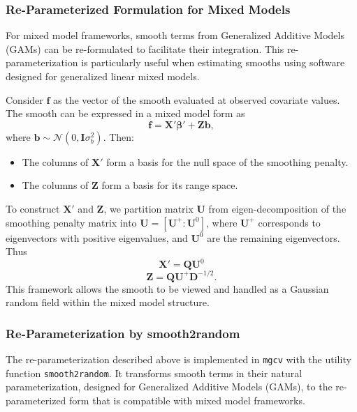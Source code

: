 \documentclass[12pt, twoside,hidelinks]{article}
\theoremstyle{definition}
\numberwithin{equation}{section}
\begin{document}
\subsubsection{Re-Parameterized Formulation for Mixed Models}\label{sec:makingsmooth:smooth2random:reparams}

For mixed model frameworks, smooth terms from Generalized Additive Models (GAMs) can be re-formulated to facilitate their integration. This re-parameterization is particularly useful when estimating smooths using software designed for generalized linear mixed models.
\newline

Consider \(\boldsymbol{f}\) as the vector of the smooth evaluated at observed covariate values. The smooth can be expressed in a mixed model form as
\[ \boldsymbol{f} = \mathbf{X}' \boldsymbol{\beta}' + \mathbf{Z}\boldsymbol{b}, \]
where \(\boldsymbol{b} \sim \mathcal{N}(0, \mathbf{I}\sigma^2_b)\). Then:
\begin{itemize}
  \item The columns of \(\mathbf{X}'\) form a basis for the null space of the smoothing penalty.
  \item The columns of \(\mathbf{Z}\) form a basis for its range space.
\end{itemize}

To construct \(\mathbf{X}'\) and \(\mathbf{Z}\), we partition matrix \(\mathbf{U}\) from eigen-decomposition of the smoothing penalty matrix into \(\mathbf{U} = [\mathbf{U}^+ : \mathbf{U}^0]\), where \(\mathbf{U}^+\) corresponds to eigenvectors with positive eigenvalues, and \(\mathbf{U}^0\) are the remaining eigenvectors. Thus
\[ \mathbf{X}' = \mathbf{QU}^0 \]
\[ \mathbf{Z} = \mathbf{QU}^+\mathbf{D}^{-1/2}. \]
This framework allows the smooth to be viewed and handled as a Gaussian random field within the mixed model structure.


\subsubsection{Re-Parameterization by smooth2random}\label{sec:makingsmooth:smooth2random:reparamssmooth2random}

The re-parameterization described above is implemented in \texttt{mgcv} with the utility function \texttt{smooth2random}. It transforms smooth terms in their natural parameterization, designed for Generalized Additive Models (GAMs), to the re-parameterized form that is compatible with mixed model frameworks. 
\end{document}
